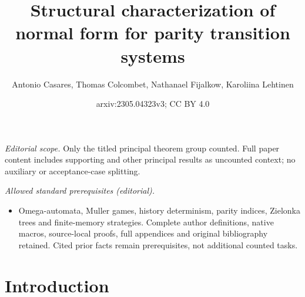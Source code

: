 \documentclass[10pt,a4paper]{amsart}
\title{Structural characterization of normal form for parity transition systems}
\author{Antonio Casares, Thomas Colcombet, Nathanael Fijalkow, Karoliina Lehtinen}
\date{arxiv:2305.04323v3; CC BY 4.0}
\begin{document}
\maketitle
\noindent\textit{Editorial scope.} Only the titled principal theorem group counted. Full paper content includes supporting and other principal results as uncounted context; no auxiliary or acceptance-case splitting.\par\medskip
\noindent\textit{Allowed standard prerequisites (editorial).}\begin{itemize}
\item Omega-automata, Muller games, history determinism, parity indices, Zielonka trees and finite-memory strategies. Complete author definitions, native macros, source-local proofs, full appendices and original bibliography retained. Cited prior facts remain prerequisites, not additional counted tasks.
\end{itemize}\medskip
	\section{Introduction}\label{section:introduction}
\end{document}
